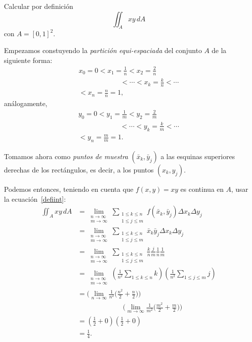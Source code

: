 \documentclass[mid,fleqn,draft,twoside]{notasdeclase}
\begin{document}
\begin{ejem}
	Calcular por definición 
	\[ \iint_{A} xy\,dA \]
	con $A = [0,1]^2$.
	
	Empezamos constuyendo la \emph{partición equi-espaciada} del conjunto $A$ de la siguiente forma:
		\begin{multline*}
			x_0=0<x_1=\frac{1}{n}<x_2=\frac{2}{n}\\
			\hspace{6em}<\cdots<x_k=\frac{k}{n}<\cdots\\
			<x_n=\frac{n}{n} =1,
		\end{multline*}
	análogamente,
	\begin{multline*}
		y_0=0<y_1=\frac{1}{m}<y_2=\frac{2}{m}\\
		\hspace{6em}<\cdots<y_k=\frac{k}{m}<\cdots\\
		<y_n=\frac{m}{m} =1.
	\end{multline*}	
	
	Tomamos ahora como \emph{puntos de muestra} $(\bar x_k,\bar y_j)$ a las esquinas superiores derechas de los rectángulos, es decir, a los puntos $(x_k,y_j)$.
	
	Podemos entonces, teniendo en cuenta que $f(x,y) = xy$ es continua en $A$, usar la ecuación~\ref{defiint}:
	{\allowdisplaybreaks
	\begin{align*}
		\iint_A xy\, dA &= \lim_{\substack{n\to\infty \\ m\to\infty}} \sum_{\substack{1\leq k\leq n \\ 1\leq j\leq m}} f(\bar x_k,\bar y_j)\Delta x_k\Delta y_j \\ 
		&=\lim_{\substack{n\to\infty \\ m\to\infty}} \sum_{\substack{1\leq k\leq n \\ 1\leq j\leq m}} \bar x_k\bar y_j \Delta x_k\Delta y_j \\
		&=\lim_{\substack{n\to\infty \\ m\to\infty}} \sum_{\substack{1\leq k\leq n \\ 1\leq j\leq m}} \frac{k}{n}\frac{j}{m}\frac{1}{n}\frac{1}{m} \\
		&=\lim_{\substack{n\to\infty \\ m\to\infty}} \left(\frac{1}{n^2}\sum_{1\leq k\leq n} k\right)\left(\frac{1}{n^2}\sum_{1\leq j\leq m} j\right) \\
		&=\biggl( \lim\limits_{n\to\infty}\frac{1}{n^2} \big(\frac{n^2}{2}+\frac{n}{2}\big) \biggr)\\
		&\phantom{a}\hspace{6em} \biggl( \lim\limits_{m\to\infty}\frac{1}{m^2} \big(\frac{m^2}{2}+\frac{m}{2}\big) \biggr) \\
		&= \left( \frac{1}{2}+0 \right)\left( \frac{1}{2}+0 \right) \\
		&= \frac{1}{4}.
	\end{align*}}
\end{ejem}
\end{document}
